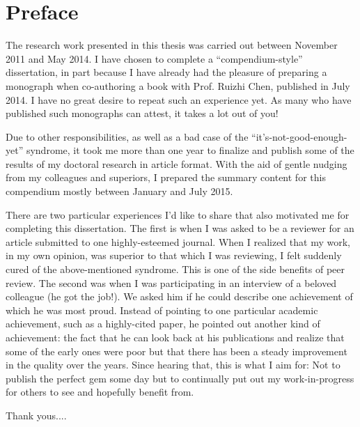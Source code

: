 \chapter*{Preface}

The research work presented in this thesis was carried out between November 2011 and May 2014. I have chosen to complete a ``compendium-style'' dissertation, in part because I have already had the pleasure of preparing a monograph when co-authoring a book with Prof. Ruizhi Chen, published in July 2014. I have no great desire to repeat such an experience yet. As many who have published such monographs can attest, it takes a lot out of you!

Due to other responsibilities, as well as a bad case of the ``it's-not-good-enough-yet'' syndrome, it took me more than one year to finalize and publish some of the results of my doctoral research in article format. With the aid of gentle nudging from my colleagues and superiors, I prepared the summary content for this compendium mostly between January and July 2015.

There are two particular experiences I'd like to share that also motivated me for completing this dissertation. The first is when I was asked to be a reviewer for an article submitted to one highly-esteemed journal. When I realized that my work, in my own opinion, was superior to that which I was reviewing, I felt suddenly cured of the above-mentioned syndrome. This is one of the side benefits of peer review. The second was when I was participating in an interview of a beloved colleague (he got the job!). We asked him if he could describe one achievement of which he was most proud. Instead of pointing to one particular academic achievement, such as a highly-cited paper, he pointed out another kind of achievement: the fact that he can look back at his publications and realize that some of the early ones were poor but that there has been a steady improvement in the quality over the years. Since hearing that, this is what I aim for: Not to publish the perfect gem some day but to continually put out my work-in-progress for others to see and hopefully benefit from.

Thank yous....

